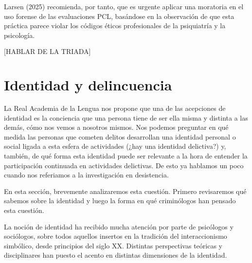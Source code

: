\documentclass[
  spanish,
  letterpaper,
  DIV=11,
  numbers=noendperiod]{scrreprt}
\begin{document}
Larsen (2025) recomienda, por tanto, que es urgente aplicar una
moratoria en el uso forense de las evaluaciones PCL, basándose en la
observación de que esta práctica parece violar los códigos éticos
profesionales de la psiquiatría y la psicología.

{[}HABLAR DE LA TRIADA{]}

\section{Identidad y delincuencia}\label{identidad-y-delincuencia}

La Real Academia de la Lengua nos propone que una de las acepciones de
identidad es la conciencia que una persona tiene de ser ella misma y
distinta a las demás, cómo nos vemos a nosotros mismos. Nos podemos
preguntar en qué medida las personas que cometen delitos desarrollan una
identidad personal o social ligada a esta esfera de actividades (¿hay
una identidad delictiva?) y, también, de qué forma esta identidad puede
ser relevante a la hora de entender la participación continuada en
actividades delictivas. De esto ya hablamos un poco cuando nos
referiamos a la investigación en desistencia.

En esta sección, brevemente analizaremos esta cuestión. Primero
revisaremos qué sabemos sobre la identidad y luego la forma en qué
criminólogos han pensado esta cuestión.

La noción de identidad ha recibido mucha atención por parte de
psicólogos y sociólogos, sobre todos aquellos insertos en la tradición
del interaccionismo simbólico, desde principios del siglo XX. Distintas
perspectivas teóricas y disciplinares han puesto el acento en distintas
dimensiones de la identidad.
\end{document}
